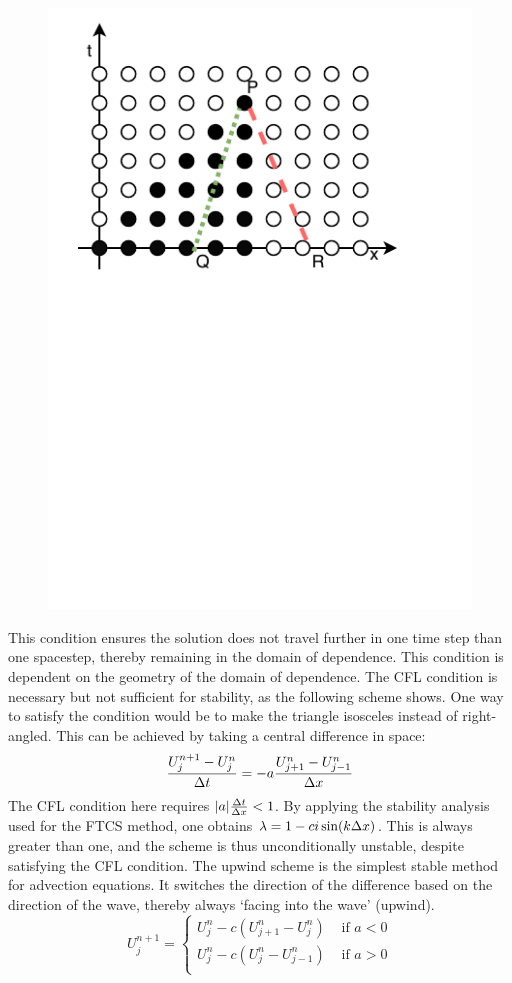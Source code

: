 \begin{figure}
    \centering
    \includegraphics[width=0.7\linewidth, trim={0 5cm 0 0}, clip]{Figures/CFL}
    \caption[CFL Condition]{}
    \label{fig:CFL}
\end{figure}
This condition ensures the solution does not travel further in one time step than one spacestep, thereby remaining in the domain of dependence. This condition is dependent on the geometry of the domain of dependence. The CFL condition is necessary but not sufficient for stability, as the following scheme shows. One way to satisfy the condition would be to make the triangle isosceles instead of right-angled. This can be achieved by taking a central difference in space:
\[
    \frac{U^{n+1}_j-U^n_j}{\Delta t} =-a \frac{U^n_{j+1}-U^n_{j-1}}{\Delta x}
\]
The CFL condition here requires $|a|\frac{\Delta t}{\Delta x} < 1$. By applying the stability analysis used for the FTCS method, one obtains $\lambda = 1-c i \sin(k\Delta x)$. This is always greater than one, and the scheme is thus unconditionally unstable, despite satisfying the CFL condition. The upwind scheme is the simplest stable method for advection equations. It switches the direction of the difference based on the direction of the wave, thereby always `facing into the wave' (upwind).
\[
U^{n+1}_{j} = \begin{cases} U^{n}_{j}-c(U^{n}_{j+1}-U^{n}_{j}) & \text{ if } a<0\\[0.5em]
U^{n}_{j}-c(U^{n}_{j}-U^{n}_{j-1}) & \text{ if } a>0\\
\end{cases}
\]
